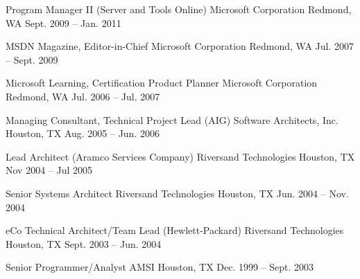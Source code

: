 \begin{cventries}

\cventry 
{Program Manager II (Server and Tools Online)}
{Microsoft Corporation}
{Redmond, WA}
{Sept. 2009 – Jan. 2011}
{}


\cventry
{MSDN Magazine, Editor-in-Chief}
{Microsoft Corporation}
{Redmond, WA}
{Jul. 2007 – Sept. 2009}
{}


\cventry 
{Microsoft Learning, Certification Product Planner}
{Microsoft Corporation}
{Redmond, WA}
{Jul. 2006 – Jul. 2007}
{}


\cventry 
{Managing Consultant, Technical Project Lead (AIG)}
{Software Architects, Inc.}
{Houston, TX}
{Aug. 2005 – Jun. 2006}
{}


\cventry 
{Lead Architect (Aramco Services Company)}
{Riversand Technologies}
{Houston, TX}
{Nov 2004 – Jul 2005}
{}


\cventry 
{Senior Systems Architect}
{Riversand Technologies}
{Houston, TX}
{Jun. 2004 – Nov. 2004}
{}


\cventry 
{eCo Technical Architect/Team Lead (Hewlett-Packard)}
{Riversand Technologies}
{Houston, TX}
{Sept. 2003 – Jun. 2004}
{}


\cventry 
{Senior Programmer/Analyst}
{AMSI}
{Houston, TX}
{Dec. 1999 – Sept. 2003}
{}


\end{cventries}